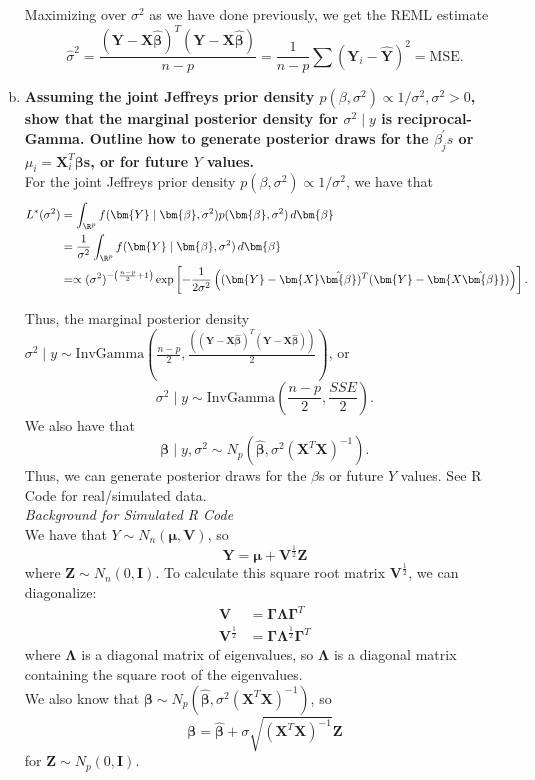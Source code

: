 \begin{enumerate}[a)]
Maximizing over $\sigma^2$ as we have done previously, we get the REML estimate
\[
    \hat{\sigma}^2 = \frac{(\bm{Y} - \bm{X\hat{\beta}})^T (\bm{Y} - \bm{X\hat{\beta}})}{n - p} = \frac{1}{n-p} \sum (\bm{Y}_i - \hat{\bm{Y}})^2 = \text{MSE}. 
\]

\item \textbf{Assuming the joint Jeffreys prior density $p(\beta, \sigma^2) \propto 1/\sigma^2, \sigma^2 > 0$, show that the marginal posterior density for $\sigma^2 \mid y$
is reciprocal-Gamma. Outline how to generate posterior draws for the $\beta_j^{\prime}s$ or $\mu_i = \bm{X}_i^T \bm{\beta}$s, or for future $Y$ values.} \\

For the joint Jeffreys prior density $p(\beta, \sigma^2) \propto 1/\sigma^2$, we have that
\begin{align*}
    L^*(\sigma^2) &= \int_{\R^p} f(\bm{Y} \mid \bm{\beta}, \sigma^2) p(\bm{\beta}, \sigma^2) \, d\bm{\beta} \\
    &= \frac{1}{\sigma^2} \int_{\R^p} f(\bm{Y} \mid \bm{\beta}, \sigma^2) \, d\bm{\beta} \\
    &=  \propto (\sigma^2)^{-\left(\frac{n - p}{2} + 1\right)}  \exp \left[ -\frac{1}{2\sigma^2} \left( (\bm{Y} - \bm{X}\hat{\bm{\beta}})^T(\bm{Y} - \bm{X\hat{\bm{\beta}}}) \right) \right].
\end{align*}

Thus, the marginal posterior density $\sigma^2 \mid y \sim \mathrm{InvGamma}\left( \frac{n-p}{2}, \frac{\left( (\bm{Y} - \bm{X}\hat{\bm{\beta}})^T(\bm{Y} - \bm{X\hat{\bm{\beta}}}) \right)}{2}\right)$, or
\[
    \boxed{\sigma^2 \mid y \sim \mathrm{InvGamma}\left( \frac{n-p}{2}, \frac{SSE}{2}\right)}. 
\]
We also have that 
\[
    \bm{\beta} \mid y, \sigma^2 \sim N_p(\hat{\bm{\beta}}, \sigma^2(\bm{X}^T\bm{X})^{-1}). 
\]
Thus, we can generate posterior draws for the $\beta$s or future $Y$ values. See R Code for real/simulated data. \\

\textit{Background for Simulated R Code} \\

We have that $Y \sim N_n(\bm{\mu}, \bm{V})$, so 
\[
    \bm{Y} = \bm{\mu} + \bm{V}^{\frac{1}{2}}\bm{Z}
\]
where $\bm{Z} \sim N_n(0, \bm{I})$. To calculate this square root matrix $\bm{V}^{\frac{1}{2}}$, we can diagonalize:
\begin{align*}
    \bm{V} &= \bm{\Gamma} \bm{\Lambda} \bm{\Gamma}^T \\
    \bm{V}^{\frac{1}{2}} &= \bm{\Gamma} \bm{\Lambda}^{\frac{1}{2}} \bm{\Gamma}^T 
\end{align*}
where $\bm{\Lambda}$ is a diagonal matrix of eigenvalues, so $\bm{\Lambda}$ is a diagonal matrix containing the square root of the eigenvalues. \\

We also know that $\bm{\beta} \sim N_p(\hat{\bm{\beta}}, \sigma^2(\bm{X}^T\bm{X})^{-1})$, so
\[
    \bm{\beta} = \hat{\bm{\beta}} + \sigma\sqrt{(\bm{X}^T\bm{X})^{-1}}\bm{Z}
\]
for $\bm{Z} \sim N_p(0, \bm{I})$.

\end{enumerate}
